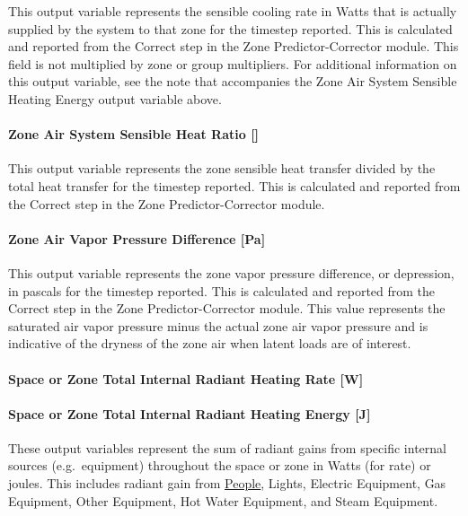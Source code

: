 This output variable represents the sensible cooling rate in Watts that is actually supplied by the system to that zone for the timestep reported. This is calculated and reported from the Correct step in the Zone Predictor-Corrector module. This field is not multiplied by zone or group multipliers. For additional information on this output variable, see the note that accompanies the Zone Air System Sensible Heating Energy output variable above.

\paragraph{Zone Air System Sensible Heat Ratio {[}{]}}\label{zone-air-system-sensible-heat-ratio}

This output variable represents the zone sensible heat transfer divided by the total heat transfer for the timestep reported. This is calculated and reported from the Correct step in the Zone Predictor-Corrector module.

\paragraph{Zone Air Vapor Pressure Difference {[}Pa{]}}\label{zone-air-vapor-pressure-difference-pa}

This output variable represents the zone vapor pressure difference, or depression, in pascals for the timestep reported. This is calculated and reported from the Correct step in the Zone Predictor-Corrector module. This value represents the saturated air vapor pressure minus the actual zone air vapor pressure and is indicative of the dryness of the zone air when latent loads are of interest.

\paragraph{Space or Zone Total Internal Radiant Heating Rate {[}W{]}}\label{zone-total-internal-radiant-heating-rate-w}

\paragraph{Space or Zone Total Internal Radiant Heating Energy {[}J{]}}\label{zone-total-internal-radiant-heating-energy-j}

These output variables represent the sum of radiant gains from specific internal sources (e.g.~equipment) throughout the space or zone in Watts (for rate) or joules. This includes radiant gain from \hyperref[people]{People}, Lights, Electric Equipment, Gas Equipment, Other Equipment, Hot Water Equipment, and Steam Equipment.

